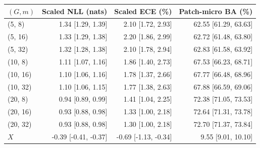 \begin{tabular}{@{}lrrr@{}}
\toprule
$(G, m)$ & Scaled NLL (nats) & Scaled ECE (\%) & Patch-micro BA (\%) \\
\midrule
(5, 8) & 1.34 [1.29, 1.39] & 2.10 [1.72, 2.93] & 62.55 [61.29, 63.63] \\
(5, 16) & 1.33 [1.29, 1.38] & 2.20 [1.86, 2.99] & 62.72 [61.48, 63.80] \\
(5, 32) & 1.32 [1.28, 1.38] & 2.10 [1.78, 2.94] & 62.83 [61.58, 63.92] \\
(10, 8) & 1.11 [1.07, 1.16] & 1.86 [1.40, 2.73] & 67.53 [66.23, 68.71] \\
(10, 16) & 1.10 [1.06, 1.16] & 1.78 [1.37, 2.66] & 67.77 [66.48, 68.96] \\
(10, 32) & 1.10 [1.06, 1.15] & 1.77 [1.38, 2.63] & 67.88 [66.59, 69.06] \\
(20, 8) & 0.94 [0.89, 0.99] & 1.41 [1.04, 2.25] & 72.38 [71.05, 73.53] \\
(20, 16) & 0.93 [0.88, 0.98] & 1.33 [1.00, 2.18] & 72.64 [71.31, 73.78] \\
(20, 32) & 0.93 [0.88, 0.98] & 1.30 [1.00, 2.18] & 72.70 [71.37, 73.84] \\
$X$ & -0.39 [-0.41, -0.37] & -0.69 [-1.13, -0.34] & 9.55 [9.01, 10.10] \\
\bottomrule
\end{tabular}
